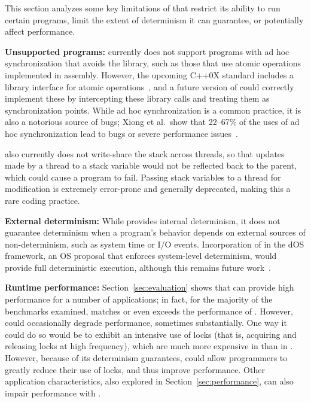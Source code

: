 \label{sec:discussion}

This section analyzes some key limitations of \dthreads{} that
restrict its ability to run certain programs, limit the extent of
determinism it can guarantee, or potentially affect performance.



\textbf{Unsupported programs: }
\dthreads{} currently does not support programs with ad hoc
synchronization that avoids the \pthreads{} library, such as those
that use atomic operations implemented in assembly.  However, the
upcoming C++0X standard includes a library interface for atomic
operations~\cite[pp. 1107--1128]{c++0xstandarddraft}, and a future
version of \dthreads{} could correctly implement these by intercepting
these library calls and treating them as synchronization points. While
ad hoc synchronization is a common practice, it is also a notorious
source of bugs; Xiong et al.\ show that 22--67\% of the uses of ad hoc
synchronization lead to bugs or severe performance
issues~\cite{ad-hoc-considered-harmful}.

\dthreads{} also currently does not write-share the stack
across threads, so that updates made by a thread to a stack variable
would not be reflected back to the parent, which could cause a program
to fail. Passing stack variables to a thread for modification is
extremely error-prone and generally deprecated, making this a rare
coding practice.

\textbf{External determinism: }
While \dthreads{} provides internal determinism, it does not
guarantee determinism when a program's behavior depends on external
sources of non-determinism, such as system time or I/O
events. Incorporation of \dthreads{} in the dOS framework, an OS
proposal that enforces system-level determinism, would provide full
deterministic execution, although this remains future
work~\cite{deterministic-process-groups}.

\textbf{Runtime performance: }
Section~\ref{sec:evaluation} shows that \dthreads{} can provide high
performance for a number of applications; in fact, for the majority of
the benchmarks examined, \dthreads{} matches or even exceeds the
performance of \pthreads{}. However, \dthreads{} could occasionally
degrade performance, sometimes substantially. One way it could do so
would be to exhibit an intensive use of locks (that is, acquiring and
releasing locks at high frequency), which are much more expensive
in \dthreads{} than in \pthreads{}. However, because of its determinism guarantees,
\dthreads{} could allow programmers to greatly reduce their use of locks, and thus
improve performance. Other application characteristics, also explored
in Section~\ref{sec:performance}, can also impair performance
with \dthreads{}.


